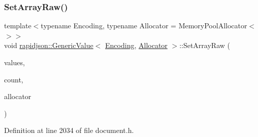 \subsubsection{\texorpdfstring{SetArrayRaw()}{SetArrayRaw()}}
{\footnotesize\ttfamily template$<$typename Encoding, typename Allocator = Memory\+Pool\+Allocator$<$$>$$>$ \\
void \mbox{\hyperlink{classrapidjson_1_1_generic_value}{rapidjson\+::\+Generic\+Value}}$<$ \mbox{\hyperlink{classrapidjson_1_1_encoding}{Encoding}}, \mbox{\hyperlink{classrapidjson_1_1_allocator}{Allocator}} $>$\+::Set\+Array\+Raw (\begin{DoxyParamCaption}\item[{\mbox{\hyperlink{classrapidjson_1_1_generic_value}{Generic\+Value}}$<$ \mbox{\hyperlink{classrapidjson_1_1_encoding}{Encoding}}, \mbox{\hyperlink{classrapidjson_1_1_allocator}{Allocator}} $>$ $\ast$}]{values,  }\item[{\mbox{\hyperlink{namespacerapidjson_a44eb33eaa523e36d466b1ced64b85c84}{Size\+Type}}}]{count,  }\item[{\mbox{\hyperlink{classrapidjson_1_1_allocator}{Allocator}} \&}]{allocator }\end{DoxyParamCaption})}



Definition at line 2034 of file document.\+h.


